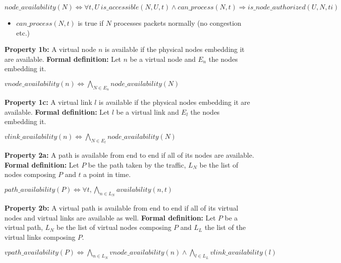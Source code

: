 \begin{myformula}
$node\_availability(N) \Leftrightarrow \forall t,U~ is\_accessible(N,U,t) \wedge can\_process(N,t) \Rightarrow is\_node\_authorized(U,N,ti)$
\end{myformula}

\begin{itemize}
\item $can\_process(N,t)$ is true if $N$ processes packets normally (\eg no congestion etc.)
\end{itemize} 

\textbf{Property 1b:} A virtual node $n$ is available if the physical nodes embedding it are available.
\newline
\textbf{Formal definition:} Let $n$ be a virtual node and $E_n$ the nodes embedding it.

\begin{myformula}
$vnode\_availability(n) \Leftrightarrow \bigwedge\limits_{N \in E_n} node\_availability(N)$
\end{myformula}

\textbf{Property 1c:} A virtual link $l$ is available if the physical nodes embedding it are available.
\newline
\textbf{Formal definition:} Let $l$ be a virtual link and $E_l$ the nodes embedding it.

\begin{myformula}
$vlink\_availability(n) \Leftrightarrow \bigwedge\limits_{N \in E_l} node\_availability(N)$
\end{myformula}

\textbf{Property 2a:} A path is available from end to end if all of its nodes are available.
\newline \textbf{Formal definition:} Let $P$ be the path taken by the traffic, $L_N$ be the list of nodes composing $P$ and $t$ a point in time. 

\begin{myformula}
$path\_availability(P)\Leftrightarrow \forall t, \bigwedge\limits_{n \in L_N}availability(n,t)$
\end{myformula}


\textbf{Property 2b:} A virtual path is available from end to end if all of its virtual nodes and virtual links are available as well.
\newline \textbf{Formal definition:} Let $P$ be a virtual path, $L_N$ be the list of virtual nodes composing $P$ and $L_L$ the list of the virtual links composing $P$.

\begin{myformula}
$vpath\_availability(P)\Leftrightarrow \bigwedge\limits_{n \in L_N}vnode\_availability(n) \wedge \bigwedge\limits_{l \in L_L}vlink\_availability(l)$
\end{myformula}

